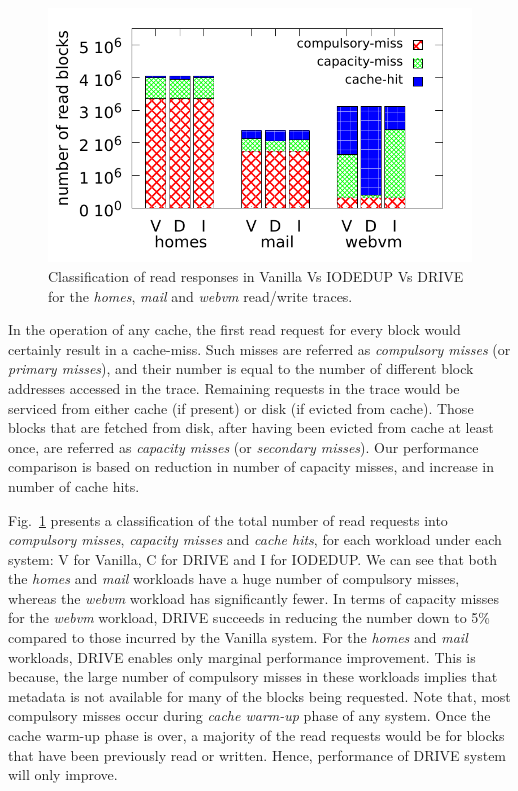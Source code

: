 \begin{figure}
	\centering
	\includegraphics[scale=0.65]{confided-figures/read-response-distrib/reads-writes/read-response-distrib-reads-n-writes.pdf}
	\caption{Classification of read responses in Vanilla Vs IODEDUP Vs DRIVE for the \textit{homes}, \textit{mail} and \textit{webvm} read/write traces.}
	\label{fig:eval-read-write-perf-c}
\end{figure}


In the operation of any cache,
the first read request for every block would certainly result in a 
cache-miss. Such misses are referred as \textit{compulsory misses}
(or \textit{primary misses}),
and their number is equal to the number of different block addresses
accessed in the trace. Remaining requests in the trace would
be serviced from either cache (if present) or disk (if evicted from 
cache). Those blocks that are fetched from disk, after having been
evicted from cache at least once, are referred as \textit{capacity misses}
(or \textit{secondary misses}). 
Our performance comparison is based on reduction in number of 
capacity misses, and increase in number of cache hits.

Fig.~\ref{fig:eval-read-write-perf-c} presents a classification
of the total number of read requests into \textit{compulsory misses},
\textit{capacity misses} and \textit{cache hits}, for each workload
under each system: V for Vanilla, C for DRIVE and I for IODEDUP.
We can see that both the \textit{homes} and \textit{mail} workloads 
have a huge number of compulsory 
misses, whereas the \textit{webvm} workload has significantly fewer. 
In terms of capacity misses for the \textit{webvm} workload, DRIVE 
succeeds in reducing the number down to 5\% compared to those incurred
by the Vanilla system.
For the \textit{homes} and \textit{mail} workloads, DRIVE enables 
only marginal performance improvement. This is because, the large
number of compulsory misses in these workloads implies that metadata 
is not available for many of the blocks being requested.
Note that, most compulsory misses occur during \textit{cache warm-up}
phase of any system. Once the cache warm-up phase is over, a majority of the
read requests would be for blocks that have been previously read or 
written. Hence, performance of DRIVE system will only improve.

